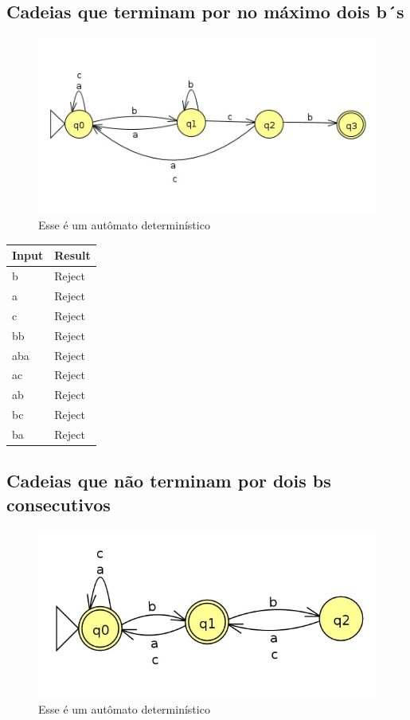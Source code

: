 \documentclass[11pt]{article}
\begin{document}
\subsection{Cadeias que terminam por no máximo dois b´s}
\label{sec:org2c9b152}
\begin{figure}[htbp]
\centering
\includegraphics[width=.9\linewidth]{./q1/b/q1b.jpg}
\caption{\label{fig:org49ce31f}
Esse é um autômato determinístico}
\end{figure}

\begin{center}
\begin{tabular}{ll}
Input & Result\\
\hline
b & Reject\\
a & Reject\\
c & Reject\\
bb & Reject\\
aba & Reject\\
ac & Reject\\
ab & Reject\\
bc & Reject\\
ba & Reject\\
\end{tabular}
\end{center}
\subsection{Cadeias que não terminam por dois bs consecutivos}
\label{sec:org1a9ddd1}
\begin{figure}[htbp]
\centering
\includegraphics[width=.9\linewidth]{./q1/c/q1c.jpg}
\caption{\label{fig:org76b7fc9}
Esse é um autômato determinístico}
\end{figure}
\end{document}
